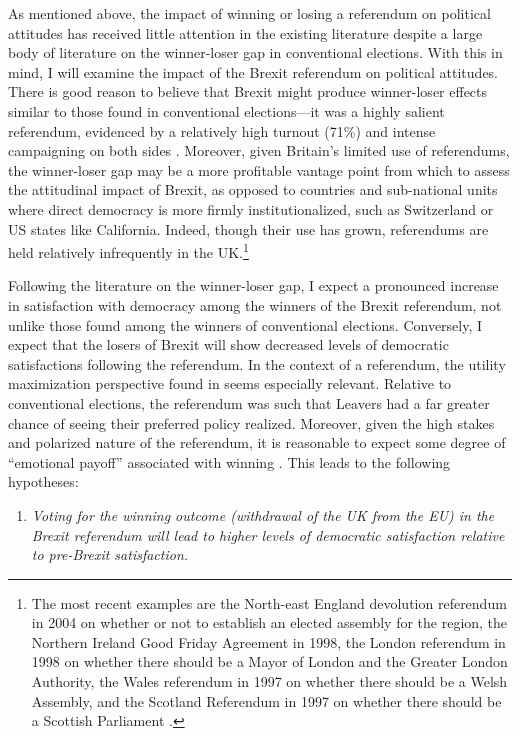 \documentclass[12pt, letter]{article}
\begin{document}
As mentioned above, the impact of winning or losing a referendum on political attitudes has received little attention in the existing literature despite a large body of literature on the winner-loser gap in conventional elections. With this in mind, I will examine the impact of the Brexit referendum on political attitudes. There is good reason to believe that Brexit might produce winner-loser effects similar to those found in conventional elections---it was a highly salient referendum, evidenced by a relatively high turnout (71\%) and intense campaigning on both sides \parencite{hobolt2016brexit}. Moreover, given Britain's limited use of referendums, the winner-loser gap may be a more profitable vantage point from which to assess the attitudinal impact of Brexit, as opposed to countries and sub-national units where direct democracy is more firmly institutionalized, such as Switzerland or US states like California. Indeed, though their use has grown, referendums are held relatively infrequently in the UK.\footnote{The most recent examples are the North-east England devolution referendum in 2004 on whether or not to establish an elected assembly for the region, the Northern Ireland Good Friday Agreement in 1998, the London referendum in 1998 on whether there should be a Mayor of London and the Greater London Authority, the Wales referendum in 1997 on whether there should be a Welsh Assembly, and the Scotland Referendum in 1997 on whether there should be a Scottish Parliament \parencite{qvortrup2006democracy}.} 

Following the literature on the winner-loser gap, I expect a pronounced increase in satisfaction with democracy among the winners of the Brexit referendum, not unlike those found among the winners of conventional elections. Conversely, I expect that the losers of Brexit will show decreased levels of democratic satisfactions following the referendum. In the context of a referendum, the utility maximization perspective found in \textcite{anderson2005losers} seems especially relevant. Relative to conventional elections, the referendum was such that Leavers had a far greater chance of seeing their preferred policy realized. Moreover, given the high stakes and polarized nature of the referendum, it is reasonable to expect some degree of ``emotional payoff'' associated with winning \parencite{blais2017election}. This leads to the following hypotheses:

\vspace{12pt}
\begin{enumerate}[label= \textbf{Hypothesis 1a (H1a)},  leftmargin=*]
  \item \textit{Voting for the winning outcome (withdrawal of the UK from the EU) in the Brexit referendum will lead to higher levels of democratic satisfaction relative to pre-Brexit satisfaction.}
\end{enumerate}
\end{document}
